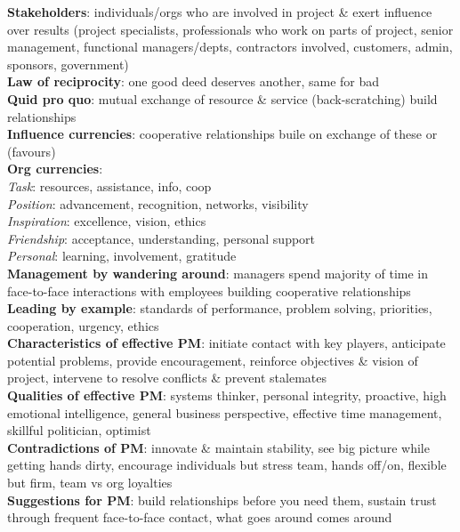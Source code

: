 \documentclass[a4paper]{article}
\begin{document}
\begin{multicols}{3}
        \textbf{Stakeholders}: individuals/orgs who are involved in project \& exert influence over results (project specialists, professionals who work on parts of project, senior management, functional managers/depts, contractors involved, customers, admin, sponsors, government)\\
        \textbf{Law of reciprocity}: one good deed deserves another, same for bad\\
        \textbf{Quid pro quo}: mutual exchange of resource \& service (back-scratching) build relationships\\
        \textbf{Influence currencies}: cooperative relationships buile on exchange of these or (favours)\\
        \textbf{Org currencies}:\\
        \textit{Task}: resources, assistance, info, coop\\
        \textit{Position}: advancement, recognition, networks, visibility\\
        \textit{Inspiration}: excellence, vision, ethics\\
        \textit{Friendship}: acceptance, understanding, personal support\\
        \textit{Personal}: learning, involvement, gratitude\\
        \textbf{Management by wandering around}: managers spend majority of time in face-to-face interactions with employees building cooperative relationships\\
        \textbf{Leading by example}: standards of performance, problem solving, priorities, cooperation, urgency, ethics\\
        \textbf{Characteristics of effective PM}: initiate contact with key players, anticipate potential problems, provide encouragement, reinforce objectives \& vision of project, intervene to resolve conflicts \& prevent stalemates\\
        \textbf{Qualities of effective PM}: systems thinker, personal integrity, proactive, high emotional intelligence, general business perspective, effective time management, skillful politician, optimist\\
        \textbf{Contradictions of PM}: innovate \& maintain stability, see big picture while getting hands dirty, encourage individuals but stress team, hands off/on, flexible but firm, team vs org loyalties\\
        \textbf{Suggestions for PM}: build relationships before you need them, sustain trust through frequent face-to-face contact, what goes around comes around\\
    \end{multicols}
    
\end{document}
